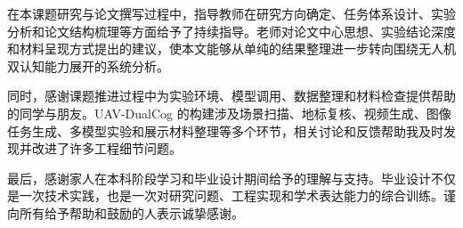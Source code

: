 
\begin{acknowledgements}
在本课题研究与论文撰写过程中，指导教师在研究方向确定、任务体系设计、实验分析和论文结构梳理等方面给予了持续指导。老师对论文中心思想、实验结论深度和材料呈现方式提出的建议，使本文能够从单纯的结果整理进一步转向围绕无人机双认知能力展开的系统分析。

同时，感谢课题推进过程中为实验环境、模型调用、数据整理和材料检查提供帮助的同学与朋友。UAV-DualCog 的构建涉及场景扫描、地标复核、视频生成、图像任务生成、多模型实验和展示材料整理等多个环节，相关讨论和反馈帮助我及时发现并改进了许多工程细节问题。

最后，感谢家人在本科阶段学习和毕业设计期间给予的理解与支持。毕业设计不仅是一次技术实践，也是一次对研究问题、工程实现和学术表达能力的综合训练。谨向所有给予帮助和鼓励的人表示诚挚感谢。
\end{acknowledgements}

